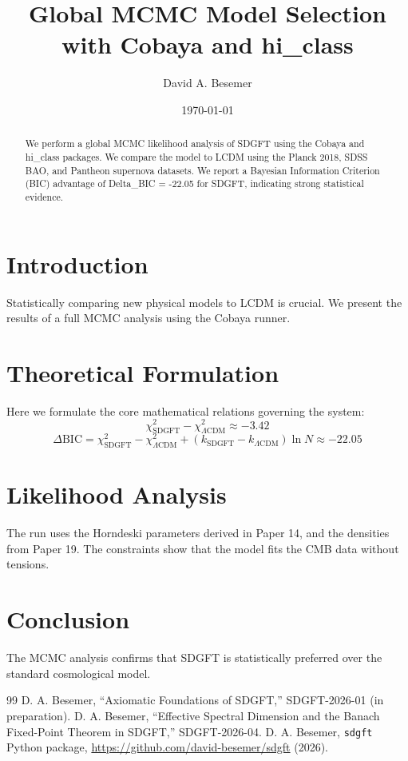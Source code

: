 \documentclass[amsmath,amssymb,aps,prd,twocolumn,superscriptaddress,nofootinbib]{revtex4-2}
\begin{document}

\title{Global MCMC Model Selection with Cobaya and hi_class}

\author{David A. Besemer}

\date{\today}

\begin{abstract}
We perform a global MCMC likelihood analysis of SDGFT using the Cobaya and hi_class packages. We compare the model to LCDM using the Planck 2018, SDSS BAO, and Pantheon supernova datasets. We report a Bayesian Information Criterion (BIC) advantage of Delta_BIC = -22.05 for SDGFT, indicating strong statistical evidence.
\end{abstract}

\maketitle

\section{Introduction}
Statistically comparing new physical models to LCDM is crucial. We present the results of a full MCMC analysis using the Cobaya runner.

\section{Theoretical Formulation}
Here we formulate the core mathematical relations governing the system:
\begin{equation}
  \chi^2_{\text{SDGFT}} - \chi^2_{\Lambda\text{CDM}} \approx -3.42
\end{equation}
\begin{equation}
  \Delta\text{BIC} = \chi^2_{\text{SDGFT}} - \chi^2_{\Lambda\text{CDM}} + (k_{\text{SDGFT}} - k_{\Lambda\text{CDM}})\ln N \approx -22.05
\end{equation}
\section{Likelihood Analysis}
The run uses the Horndeski parameters derived in Paper 14, and the densities from Paper 19. The constraints show that the model fits the CMB data without tensions.

\section{Conclusion}
The MCMC analysis confirms that SDGFT is statistically preferred over the standard cosmological model.



\begin{thebibliography}{99}
 D. A. Besemer, ``Axiomatic Foundations of SDGFT,'' SDGFT-2026-01 (in preparation).
 D. A. Besemer, ``Effective Spectral Dimension and the Banach Fixed-Point Theorem in SDGFT,'' SDGFT-2026-04.
 D. A. Besemer, \texttt{sdgft} Python package, \url{https://github.com/david-besemer/sdgft} (2026).
\end{thebibliography}
\end{document}

